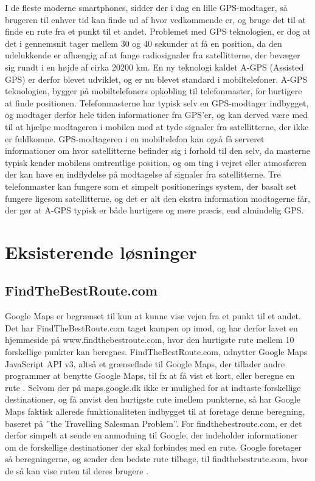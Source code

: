 I de fleste moderne smartphones, sidder der i dag en lille GPS-modtager, så brugeren til enhver tid kan finde ud af hvor vedkommende er, og bruge det til at finde en rute fra et punkt til et andet. Problemet med GPS teknologien, er dog at det i gennemsnit tager mellem 30 og 40 sekunder at få en position, da den udelukkende er afhængig af at fange radiosignaler fra satellitterne, der bevæger sig rundt i en højde af cirka 20200 km.  En ny teknologi kaldet A-GPS (Assisted GPS) er derfor blevet udviklet, og er nu blevet standard i mobiltelefoner. A-GPS teknologien, bygger på mobiltelefoners opkobling til telefonmaster, for hurtigere at finde positionen. Telefonmasterne har typisk selv en GPS-modtager indbygget, og modtager derfor hele tiden informationer fra GPS’er, og kan derved være med til at hjælpe modtageren i mobilen med at tyde signaler fra satellitterne, der ikke er fuldkomne. GPS-modtageren i en mobiltelefon kan også få serveret informationer om hvor satellitterne befinder sig i forhold til den selv, da masterne typisk kender mobilens omtrentlige position, og om ting i vejret eller atmosfæren der kan have en indflydelse på modtagelse af signaler fra satellitterne. 
Tre telefonmaster kan fungere som et simpelt positionerings system, der basalt set fungere ligesom satellitterne, og det er alt den ekstra information modtagerne får, der gør at A-GPS typisk er både hurtigere og mere præcis, end almindelig GPS.

\section{Eksisterende løsninger}
\subsection{FindTheBestRoute.com}
Google Maps er begrænset til kun at kunne vise vejen fra et punkt til et andet. Det har FindTheBestRoute.com taget kampen op imod, og har derfor lavet en hjemmeside på www.findthebestroute.com, hvor den hurtigste rute mellem 10 forskellige punkter kan beregnes. FindTheBestRoute.com, udnytter Google Maps JavaScript API v3, altså et grænseflade til Google Maps, der tillader andre programmer at benytte Google Maps, til fx at få vist et kort, eller beregne en rute \citep{ftbr}. Selvom der på maps.google.dk ikke er mulighed for at indtaste forskellige destinationer, og få anvist den hurtigste rute imellem punkterne, så har Google Maps faktisk allerede funktionaliteten indbygget til at foretage denne beregning, baseret på ”the Travelling Salesman Problem”. For findthebestroute.com, er det derfor simpelt at sende en anmodning til Google, der indeholder informationer om de forskellige destinationer der skal forbindes med en rute. Google foretager så beregningerne, og sender den bedste rute tilbage, til findthebestrute.com, hvor de så kan vise ruten til deres brugere \citep{googleapi}.

